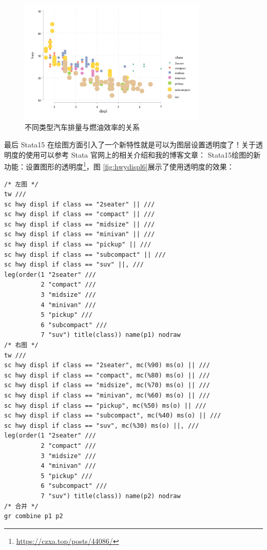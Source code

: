 \documentclass[]{ctexbook}
\renewcommand{\href}[2]{#2\footnote{\url{#1}}}
\begin{document}
\begin{figure}

{\centering \includegraphics[width=0.8\textwidth]{assets/hwydispl5} 

}

\caption{不同类型汽车排量与燃油效率的关系}\label{fig:hwydispl5}
\end{figure}

最后 Stata15 在绘图方面引入了一个新特性就是可以为图层设置透明度了！关于透明度的使用可以参考 Stata 官网上的相关介绍和我的博客文章： \href{https://czxa.top/posts/44086/}{Stata15绘图的新功能：设置图形的透明度}，图 \ref{fig:hwydispl6}展示了使用透明度的效果：

\begin{lstlisting}
/* 左图 */
tw ///
sc hwy displ if class == "2seater" || ///
sc hwy displ if class == "compact" || ///
sc hwy displ if class == "midsize" || ///
sc hwy displ if class == "minivan" || ///
sc hwy displ if class == "pickup" || ///
sc hwy displ if class == "subcompact" || ///
sc hwy displ if class == "suv" ||, ///
leg(order(1 "2seater" ///
          2 "compact" ///
          3 "midsize" ///
          4 "minivan" ///
          5 "pickup" ///
          6 "subcompact" ///
          7 "suv") title(class)) name(p1) nodraw
/* 右图 */
tw ///
sc hwy displ if class == "2seater", mc(%90) ms(o) || ///
sc hwy displ if class == "compact", mc(%80) ms(o) || ///
sc hwy displ if class == "midsize", mc(%70) ms(o) || ///
sc hwy displ if class == "minivan", mc(%60) ms(o) || ///
sc hwy displ if class == "pickup", mc(%50) ms(o) || ///
sc hwy displ if class == "subcompact", mc(%40) ms(o) || ///
sc hwy displ if class == "suv", mc(%30) ms(o) ||, ///
leg(order(1 "2seater" ///
          2 "compact" ///
          3 "midsize" ///
          4 "minivan" ///
          5 "pickup" ///
          6 "subcompact" ///
          7 "suv") title(class)) name(p2) nodraw
/* 合并 */
gr combine p1 p2
\end{lstlisting}
\end{document}
